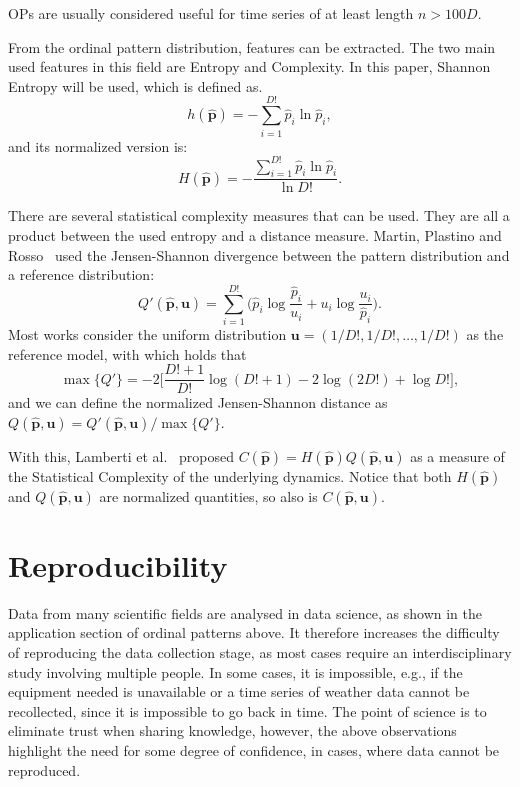OPs are usually considered useful for time series of at least length $n>100D$.

From the ordinal pattern distribution, features can be extracted. 
The two main used features in this field are Entropy and Complexity. 
In this paper, Shannon Entropy will be used, which is defined as.
$$
h(\widehat{\bm p})=-\sum_{i=1}^{D!} \widehat{p}_i \ln \widehat{p}_i,
$$
and its normalized version is:
$$
H(\widehat{\bm p})=-\frac{\sum_{i=1}^{D!} \widehat{p}_i  \ln \widehat{p}_i}{\ln D!}.
$$

There are several statistical complexity measures that can be used. 
They are all a product between the used entropy and a distance measure. 
Martin, Plastino and Rosso~\cite{Martin2003} used the Jensen-Shannon divergence between the pattern distribution and a reference distribution:
\begin{equation}
	Q'(\widehat{\bm p}, \bm{u}) = \sum_{i=1}^{D!} \Big(\widehat{p}_i \log\frac{\widehat{p}_i}{u_i} +
	u_i \log\frac{u_i}{\widehat{p}_i}
	\Big).
	\label{eq:JensenShannon}
\end{equation}
Most works consider the uniform distribution $\bm u = (1/D!, 1/D!, \dots, 1/D!)$ as the reference model, with which holds that
$$
\max\{Q'\} = -2\Big[
\frac{D!+1}{D!} \log(D!+1) - 2 \log(2D!) + \log D!
\Big],
$$
and we can define the normalized Jensen-Shannon distance as $Q(\widehat{\bm p}, \bm{u})=Q'(\widehat{\bm p}, \bm{u})/\max\{Q'\}$.

With this, Lamberti et al.~\cite{Lamberti2004} proposed $C(\widehat{\bm p})=H(\widehat{\bm p})Q(\widehat{\bm p}, \bm{u})$ as a measure of the Statistical Complexity of the underlying dynamics.
Notice that both $H(\widehat{\bm p})$ and $Q(\widehat{\bm p}, \bm{u})$ are normalized quantities, so also is $C(\widehat{\bm p}, \bm{u})$. 

\section{Reproducibility}

Data from many scientific fields are analysed in data science, as shown in the application section of ordinal patterns above. 
It therefore increases the difficulty of reproducing the data collection stage, as most cases require an interdisciplinary study involving multiple people. 
In some cases, it is impossible, e.g., if the equipment needed is unavailable or a time series of weather data cannot be recollected, since it is impossible to go back in time. 
The point of science is to eliminate trust when sharing knowledge, however, the above observations highlight the need for some degree of confidence, in cases, where data cannot be reproduced. 

